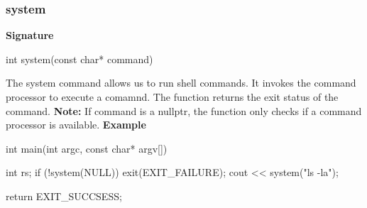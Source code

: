 \documentclass{report}
\begin{document}
    \bigbreak \noindent 
    \subsubsection{system}
    \bigbreak \noindent 
    \textbf{Signature}
    \bigbreak \noindent 
    \begin{cppcode}
    int system(const char* command)
    \end{cppcode}
    \bigbreak \noindent 
    The system command allows us to run shell commands. It invokes the command processor to execute a comamnd. The function returns the exit status of the command.
    \bigbreak \noindent 
    \textbf{Note:} If command is a nullptr, the function only checks if a command processor is available. 
    \bigbreak \noindent 
    \textbf{Example}
    \bigbreak \noindent 
    \begin{cppcode}
        int main(int argc, const char* argv[]) {
            int rs;
            if (!system(NULL)) {
                exit(EXIT_FAILURE);
            }
            cout << system("ls -la");

            return EXIT_SUCCSESS;
        }
    \end{cppcode}

    \pagebreak 
    \bigbreak \noindent 
    \subsection{}

    

    
\end{document}
